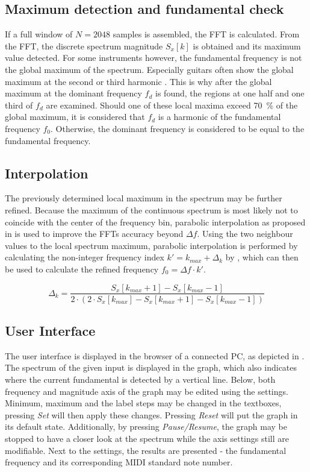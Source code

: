 \documentclass[a4paper, 12pt]{article}
\begin{document}
\subsection{Maximum detection and fundamental check}
If a full window of $N=2048$ samples is assembled, the FFT is calculated. From the FFT, the discrete spectrum magnitude $S_x[k]$ is obtained and its maximum value detected. For some instruments however, the fundamental frequency is not the global maximum of the spectrum. Especially guitars often show the global maximum at the second or third harmonic \cite{Knesebeck2010}. This is why after the global maximum at the dominant frequency $f_d$ is found, the regions at one half and one third of $f_d$ are examined. Should one of these local maxima exceed \SI{70}{\percent} of the global maximum, it is considered that $f_d$ is a harmonic of the fundamental frequency $f_0$. Otherwise, the dominant frequency is considered to be equal to the fundamental frequency.

\subsection{Interpolation}
The previously determined local maximum in the spectrum may be further refined. Because the maximum of the continuous spectrum is most likely not to coincide with the center of the frequency bin, parabolic interpolation as proposed in \cite{Gasior2004} is used to improve the FFTs accuracy beyond $\Delta f$. Using the two neighbour values to the local spectrum maximum, parabolic interpolation is performed by calculating the non-integer frequency index $k' = k_{max} + \Delta_k$ by , which can then be used to calculate the refined frequency $f_0= \Delta f \cdot k'$.

\begin{equation}
	\label{eq:interpol}
	\Delta_k = \frac{S_x[k_{max}+1] - S_x[k_{max}-1]}{2 \cdot (2 \cdot S_x[k_{max}] - S_x[k_{max}+1] - S_x[k_{max}-1])}
\end{equation}

\subsection{User Interface} \label{sec:gui}
The user interface is displayed in the browser of a connected PC, as depicted in . The spectrum of the given input is displayed in the graph, which also indicates where the current fundamental is detected by a vertical line. Below, both frequency and magnitude axis of the graph may be edited using the settings. Minimum, maximum and the label steps may be changed in the textboxes, pressing \emph{Set} will then apply these changes. Pressing \emph{Reset} will put the graph in its default state. Additionally, by pressing \emph{Pause/Resume}, the graph may be stopped to have a closer look at the spectrum while the axis settings still are modifiable. Next to the settings, the results are presented - the fundamental frequency and its corresponding MIDI standard note number.
\end{document}
